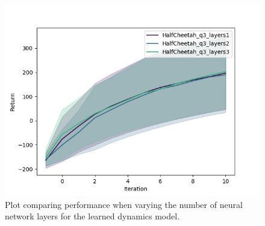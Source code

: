 \documentclass[a4paper]{article}
\begin{document}
\begin{figure}[H]
\centering
\includegraphics[width=1\textwidth]{p3bc.jpg}
\caption{Plot comparing performance when varying the number of neural network
layers for the learned dynamics model.}
\end{figure}
\end{document}
